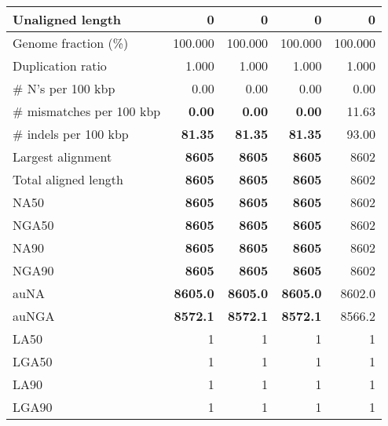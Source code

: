 \documentclass[12pt,a4paper]{article}
\begin{document}
\begin{table}[ht]
\begin{center}
\begin{tabular}{|l*{4}{|r}|}
Unaligned length & 0 & 0 & 0 & 0 \\ \hline
Genome fraction (\%) & 100.000 & 100.000 & 100.000 & 100.000 \\ \hline
Duplication ratio & 1.000 & 1.000 & 1.000 & 1.000 \\ \hline
\# N's per 100 kbp & 0.00 & 0.00 & 0.00 & 0.00 \\ \hline
\# mismatches per 100 kbp & {\bf 0.00} & {\bf 0.00} & {\bf 0.00} & 11.63 \\ \hline
\# indels per 100 kbp & {\bf 81.35} & {\bf 81.35} & {\bf 81.35} & 93.00 \\ \hline
Largest alignment & {\bf 8605} & {\bf 8605} & {\bf 8605} & 8602 \\ \hline
Total aligned length & {\bf 8605} & {\bf 8605} & {\bf 8605} & 8602 \\ \hline
NA50 & {\bf 8605} & {\bf 8605} & {\bf 8605} & 8602 \\ \hline
NGA50 & {\bf 8605} & {\bf 8605} & {\bf 8605} & 8602 \\ \hline
NA90 & {\bf 8605} & {\bf 8605} & {\bf 8605} & 8602 \\ \hline
NGA90 & {\bf 8605} & {\bf 8605} & {\bf 8605} & 8602 \\ \hline
auNA & {\bf 8605.0} & {\bf 8605.0} & {\bf 8605.0} & 8602.0 \\ \hline
auNGA & {\bf 8572.1} & {\bf 8572.1} & {\bf 8572.1} & 8566.2 \\ \hline
LA50 & 1 & 1 & 1 & 1 \\ \hline
LGA50 & 1 & 1 & 1 & 1 \\ \hline
LA90 & 1 & 1 & 1 & 1 \\ \hline
LGA90 & 1 & 1 & 1 & 1 \\ \hline
\end{tabular}
\end{center}
\end{table}
\end{document}
